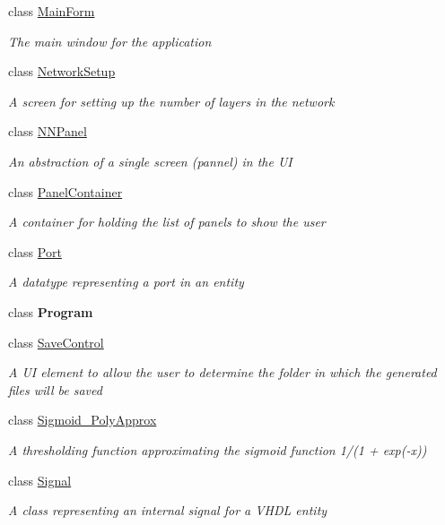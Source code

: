 \begin{DoxyCompactItemize}
class \hyperlink{class_n_n_gen_1_1_main_form}{Main\+Form}
\begin{DoxyCompactList}\small\item\em The main window for the application \end{DoxyCompactList}\item 
class \hyperlink{class_n_n_gen_1_1_network_setup}{Network\+Setup}
\begin{DoxyCompactList}\small\item\em A screen for setting up the number of layers in the network \end{DoxyCompactList}\item 
class \hyperlink{class_n_n_gen_1_1_n_n_panel}{N\+N\+Panel}
\begin{DoxyCompactList}\small\item\em An abstraction of a single screen (pannel) in the U\+I \end{DoxyCompactList}\item 
class \hyperlink{class_n_n_gen_1_1_panel_container}{Panel\+Container}
\begin{DoxyCompactList}\small\item\em A container for holding the list of panels to show the user \end{DoxyCompactList}\item 
class \hyperlink{class_n_n_gen_1_1_port}{Port}
\begin{DoxyCompactList}\small\item\em A datatype representing a port in an entity \end{DoxyCompactList}\item 
class {\bfseries Program}
\item 
class \hyperlink{class_n_n_gen_1_1_save_control}{Save\+Control}
\begin{DoxyCompactList}\small\item\em A U\+I element to allow the user to determine the folder in which the generated files will be saved \end{DoxyCompactList}\item 
class \hyperlink{class_n_n_gen_1_1_sigmoid___poly_approx}{Sigmoid\+\_\+\+Poly\+Approx}
\begin{DoxyCompactList}\small\item\em A thresholding function approximating the sigmoid function 1/(1 + exp(-\/x)) \end{DoxyCompactList}\item 
class \hyperlink{class_n_n_gen_1_1_signal}{Signal}
\begin{DoxyCompactList}\small\item\em A class representing an internal signal for a V\+H\+D\+L entity \end{DoxyCompactList}\item 

\end{DoxyCompactItemize}
